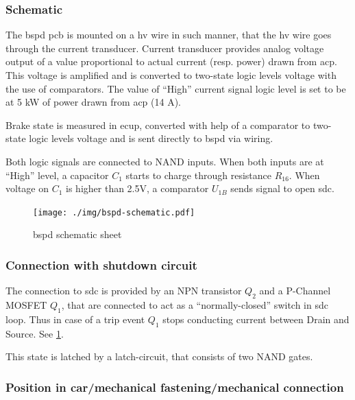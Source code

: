 \subsubsection{Schematic}
The \gls{bspd} \gls{pcb} is mounted on a \gls{hv} wire in such manner, that the \gls{hv} wire goes through the
current transducer. Current transducer provides analog voltage output of a value proportional to
actual current (resp. power) drawn from \gls{acp}. This voltage is amplified and is converted to two-state
logic levels voltage with the use of comparators. The value of “High” current signal logic level
is set to be at 5 kW of power drawn from \gls{acp} (14 A).

Brake state is measured in \gls{ecup}, converted with help of a comparator to two-state logic levels
voltage and is sent directly to \gls{bspd} via wiring.

Both logic signals are connected to NAND inputs. When both inputs are at “High” level, a
capacitor $C_1$ starts to charge through resistance $R_{16}$. When voltage on $C_1$ is higher than 2.5V, a
comparator $U_{1B}$ sends signal to open \gls{sdc}.

\begin{figure}[H]
	\centering
	\texttt{[image: ./img/bspd-schematic.pdf]}
	\caption{\gls{bspd} schematic sheet}
	\label{fig:BSPD-schematic}
\end{figure}

\subsubsection{Connection with shutdown circuit}
The connection to \gls{sdc} is provided by an NPN transistor $Q_2$ and a P-Channel MOSFET $Q_1$, that
are connected to act as a “normally-closed” switch in \gls{sdc} loop. Thus in case of a trip event $Q_1$
stops conducting current between Drain and Source. See \ref{fig:BSPD-schematic}.

This state is latched by a latch-circuit, that consists of two NAND gates.

\subsubsection{Position in car/mechanical fastening/mechanical connection}

